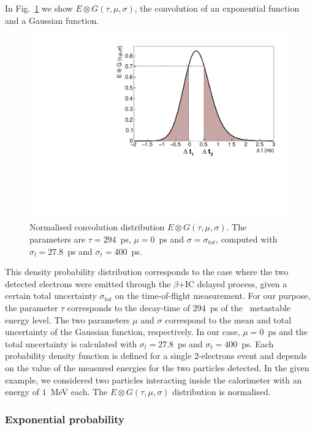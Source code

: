 In Fig.~\ref{fig:Pexp} we show $E \otimes G(\tau,\mu,\sigma)$, the convolution of an exponential function and a Gaussian function.
\begin{figure}[!h]
  \centering
  \includegraphics[width=13cm]{timedifference/fig_timediff/proba_expo.pdf}
  \caption{Normalised convolution distribution $E \otimes G (\tau,\mu,\sigma)$.
    The parameters are $\tau=294$~ps, $\mu=0$~ps and $\sigma=\sigma_{tot}$, computed with $\sigma_{l}=27.8$~ps and $\sigma_{t}=400$~ps.
    \label{fig:Pexp}}
\end{figure}
This density probability distribution corresponds to the case where the two detected electrons were emitted through the $\beta$+IC delayed process, given a certain total uncertainty $\sigma_{tot}$ on the time-of-flight measurement.
For our purpose, the parameter $\tau$ corresponds to the decay-time of $294$~ps of the \Tl\ metastable energy level.
The two parameters $\mu$ and $\sigma$ correspond to the mean and total uncertainty of the Gaussian function, respectively.
In our case, $\mu=0$~ps and the total uncertainty is calculated with $\sigma_{l}=27.8$~ps and $\sigma_{t}=400$~ps.
Each probability density function is defined for a single $2$-electrons event and depends on the value of the measured energies for the two particles detected.
In the given example, we considered two particles interacting inside the calorimeter with an energy of $1$~MeV each.
The $E \otimes G(\tau,\mu,\sigma)$ distribution is normalised.



\subsubsection{Exponential probability}

